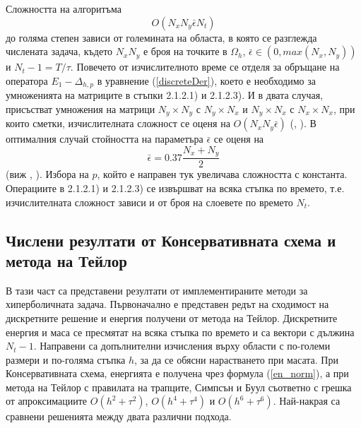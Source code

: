 \documentclass[a4paper]{article}
\newcommand{\rf}[1]{(\ref{#1})}
\theoremstyle{remark}
\begin{document}
Сложността на алгоритъма 
$$ O(N_x N_y \bar \epsilon N_t ) $$
до голяма степен зависи от големината на областа, в която се разглежда числената задача, където $N_x N_y$ е броя на точките в $\Omega_h$, $\bar\epsilon \in (0, max(N_x,N_y) )$ и $N_t -1= T/\tau$. Повечето от изчислителното време се отделя за обръщане на оператора $E_1-\Delta_{h,p}$ в уравнение \rf{discreteDer}, което е необходимо за умноженията на матриците в стъпки 2.1.2.1) и 2.1.2.3). И в двата случая, присъстват умножения на матрици $N_y \times N_y$ с  $N_y \times N_x$ и $N_y \times N_x$ с  $N_x \times N_x$, при които сметки, изчислителната сложност се оценя на $ O( N_x N_y \bar\epsilon)$ (\cite{ref26}, \cite{ref27}). В оптималния случай стойността на параметъра $\bar\epsilon$ се оценя на $$\bar\epsilon = 0.37\frac{N_x + N_y}{2}$$ (виж \cite{ref26}, \cite{ref27}). Избора на $p$, който е направен тук увеличава сложността с константа. Операциите в 2.1.2.1) и 2.1.2.3) се извършват на всяка стъпка по времето, т.е. изчислителната сложност зависи и от броя на слоевете по времето $N_t$.

\subsection{Числени резултати от Консервативната схема и метода на Тейлор }
В тази част са представени резултати от имплементираните методи за хиперболичната задача.
Първоначално е представен редът на сходимост на дискретните решение и енергия получени от метода на Тейлор. Дискретните енергия и маса се пресмятат на всяка стъпка по времето и са вектори с дължина $N_t - 1$. Направени са допълнителни изчисления върху области с по-големи размери и по-голяма стъпка $h$, за да се обясни нарастването при масата. При Консервативната схема, енергията е получена чрез формула \rf{en_norm}, а при метода на Тейлор с правилата на трапците, Симпсън и Буул съответно с грешка от апроксимациите $O(h^{2} + \tau^2 )$, $O(h^{4} + \tau^4 )$ и $O(h^{6} + \tau^6 )$. Най-накрая са сравнени решенията между двата различни подхода. 
\end{document}
